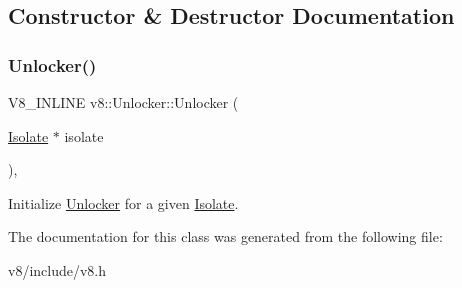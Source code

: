 \subsection{Constructor \& Destructor Documentation}
\mbox{\label{classv8_1_1Unlocker_a2faeb117d7308b65ac85fdad390e4c1f}} 
\subsubsection{\texorpdfstring{Unlocker()}{Unlocker()}}
{\footnotesize\ttfamily V8\+\_\+\+I\+N\+L\+I\+NE v8\+::\+Unlocker\+::\+Unlocker (\begin{DoxyParamCaption}\item[{\mbox{\hyperlink{classv8_1_1Isolate}{Isolate}} $\ast$}]{isolate }\end{DoxyParamCaption})\hspace{0.3cm}{\ttfamily [inline]}, {\ttfamily [explicit]}}

Initialize \mbox{\hyperlink{classv8_1_1Unlocker}{Unlocker}} for a given \mbox{\hyperlink{classv8_1_1Isolate}{Isolate}}. 

The documentation for this class was generated from the following file\+:\begin{DoxyCompactItemize}
\item 
v8/include/v8.\+h\end{DoxyCompactItemize}
